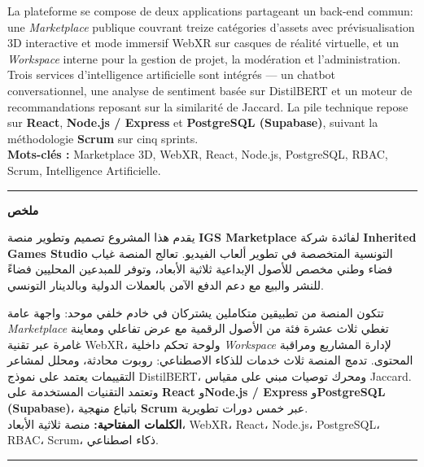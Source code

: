 La plateforme se compose de deux applications partageant un back-end commun: une
\textit{Marketplace} publique couvrant treize catégories d'assets avec prévisualisation
3D interactive et mode immersif WebXR sur casques de réalité virtuelle, et un
\textit{Workspace} interne pour la gestion de projet, la modération et l'administration.
Trois services d'intelligence artificielle sont intégrés --- un chatbot conversationnel,
une analyse de sentiment basée sur DistilBERT et un moteur de recommandations
reposant sur la similarité de Jaccard. La pile technique repose sur \textbf{React},
\textbf{Node.js / Express} et \textbf{PostgreSQL (Supabase)}, suivant la méthodologie
\textbf{Scrum} sur cinq sprints.\\[1pt]
\textbf{Mots-clés :} Marketplace 3D, WebXR, React, Node.js, PostgreSQL, RBAC, Scrum, Intelligence Artificielle.

\noindent\rule{\textwidth}{0.4pt}

\begin{Arabic}
\vspace{0.1cm}
\begin{center}{\bfseries\large\color{isiBlue} ملخص}\end{center}
\vspace{0.05cm}
\footnotesize

يقدم هذا المشروع تصميم وتطوير منصة \textbf{IGS Marketplace} لفائدة شركة
\textbf{Inherited Games Studio} التونسية المتخصصة في تطوير ألعاب الفيديو. تعالج
المنصة غياب فضاء وطني مخصص للأصول الإبداعية ثلاثية الأبعاد، وتوفر للمبدعين المحليين
فضاءً للنشر والبيع مع دعم الدفع الآمن بالعملات الدولية وبالدينار التونسي.

تتكون المنصة من تطبيقين متكاملين يشتركان في خادم خلفي موحد: واجهة عامة
\textit{Marketplace} تغطي ثلاث عشرة فئة من الأصول الرقمية مع عرض تفاعلي ومعاينة
غامرة عبر تقنية WebXR، ولوحة تحكم داخلية \textit{Workspace} لإدارة المشاريع
ومراقبة المحتوى. تدمج المنصة ثلاث خدمات للذكاء الاصطناعي: روبوت محادثة، ومحلل
لمشاعر التقييمات يعتمد على نموذج DistilBERT، ومحرك توصيات مبني على مقياس Jaccard.
وتعتمد التقنيات المستخدمة على \textbf{React} و\textbf{Node.js / Express}
و\textbf{PostgreSQL (Supabase)}، باتباع منهجية \textbf{Scrum} عبر خمس دورات تطويرية.\\[1pt]
\textbf{الكلمات المفتاحية:} منصة ثلاثية الأبعاد، WebXR، React، Node.js، PostgreSQL، RBAC، Scrum، ذكاء اصطناعي.
\end{Arabic}

\noindent\rule{\textwidth}{1.5pt}

\restoregeometry
